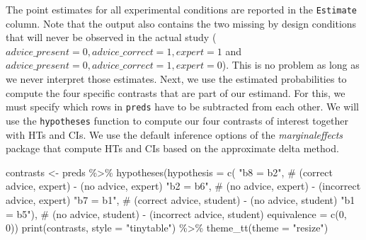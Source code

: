 \documentclass[
  man,
  floatsintext,
  longtable,
  a4paper,
  nolmodern,
  notxfonts,
  notimes,
  colorlinks=true,linkcolor=blue,citecolor=blue,urlcolor=blue]{apa7}
\newenvironment{Shaded}{\begin{snugshade}}{\end{snugshade}}
\newcommand{\AttributeTok}[1]{\textcolor[rgb]{0.40,0.45,0.13}{#1}}
\newcommand{\CommentTok}[1]{\textcolor[rgb]{0.37,0.37,0.37}{#1}}
\newcommand{\DecValTok}[1]{\textcolor[rgb]{0.68,0.00,0.00}{#1}}
\newcommand{\FunctionTok}[1]{\textcolor[rgb]{0.28,0.35,0.67}{#1}}
\newcommand{\NormalTok}[1]{\textcolor[rgb]{0.00,0.23,0.31}{#1}}
\newcommand{\OtherTok}[1]{\textcolor[rgb]{0.00,0.23,0.31}{#1}}
\newcommand{\SpecialCharTok}[1]{\textcolor[rgb]{0.37,0.37,0.37}{#1}}
\newcommand{\StringTok}[1]{\textcolor[rgb]{0.13,0.47,0.30}{#1}}
\begin{document}
The point estimates for all experimental conditions are reported in the
\texttt{Estimate} column. Note that the output also contains the two
missing by design conditions that will never be observed in the actual
study (\(advice\_present = 0, advice\_correct = 1, expert = 1\) and
\(advice\_present = 0, advice\_correct = 1, expert = 0\)). This is no
problem as long as we never interpret those estimates. Next, we use the
estimated probabilities to compute the four specific contrasts that are
part of our estimand. For this, we must specify which rows in
\texttt{preds} have to be subtracted from each other. We will use the
\texttt{hypotheses} function to compute our four contrasts of interest
together with HTs and CIs. We use the default inference options of the
\emph{marginaleffects} package that compute HTs and CIs based on the
approximate delta method.

\begin{Shaded}
\begin{Highlighting}[]
\NormalTok{contrasts }\OtherTok{\textless{}{-}}\NormalTok{ preds }\SpecialCharTok{\%\textgreater{}\%} 
  \FunctionTok{hypotheses}\NormalTok{(}\AttributeTok{hypothesis =} \FunctionTok{c}\NormalTok{(}
    \StringTok{"b8 = b2"}\NormalTok{,  }\CommentTok{\# (correct advice, expert) {-} (no advice, expert)}
    \StringTok{"b2 = b6"}\NormalTok{,  }\CommentTok{\# (no advice, expert) {-} (incorrect advice, expert) }
    \StringTok{"b7 = b1"}\NormalTok{,  }\CommentTok{\# (correct advice, student) {-} (no advice, student)}
    \StringTok{"b1 = b5"}\NormalTok{), }\CommentTok{\# (no advice, student) {-} (incorrect advice, student)}
    \AttributeTok{equivalence =} \FunctionTok{c}\NormalTok{(}\DecValTok{0}\NormalTok{, }\DecValTok{0}\NormalTok{))}
\FunctionTok{print}\NormalTok{(contrasts, }\AttributeTok{style =} \StringTok{"tinytable"}\NormalTok{) }\SpecialCharTok{\%\textgreater{}\%} \FunctionTok{theme\_tt}\NormalTok{(}\AttributeTok{theme =} \StringTok{"resize"}\NormalTok{)}
\end{Highlighting}
\end{Shaded}
\end{document}

